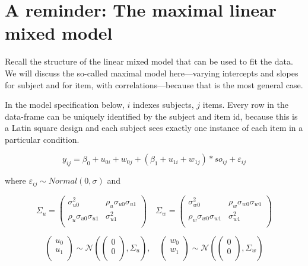 \documentclass[12pt,]{krantz}
\begin{document}
\hypertarget{a-reminder-the-maximal-linear-mixed-model}{%
\section{A reminder: The maximal linear mixed model}\label{a-reminder-the-maximal-linear-mixed-model}}

Recall the structure of the linear mixed model that can be used to fit the \citet{grodner} data. We will discuss the so-called maximal model here---varying intercepts and slopes for subject and for item, with correlations---because that is the most general case.

In the model specification below, \(i\) indexes subjects, \(j\) items. Every row in the data-frame can be uniquely identified by the subject and item id, because this is a Latin square design and each subject sees exactly one instance of each item in a particular condition.

\begin{equation}
y_{ij} = \beta_0 + u_{0i} + w_{0j} + (\beta_1 + u_{1i} + w_{1j}) * so_{ij} + \varepsilon_{ij}
\end{equation}

where \(\varepsilon_{ij} \sim Normal(0,\sigma)\) and

\begin{equation}\label{eq:covmatsimulations}
\Sigma_u
=
\begin{pmatrix}
\sigma _{u0}^2  & \rho _{u}\sigma _{u0}\sigma _{u1}\\
\rho _{u}\sigma _{u0}\sigma _{u1}    & \sigma _{u1}^2\\
\end{pmatrix}
\quad 
\Sigma _w
=
\begin{pmatrix}
\sigma _{w0}^2  & \rho _{w}\sigma _{w0}\sigma _{w1}\\
\rho _{w}\sigma _{w0}\sigma _{w1}    & \sigma _{w1}^2\\
\end{pmatrix}
\end{equation}

\begin{equation}\label{eq:jointpriordistsimulation}
\begin{pmatrix}
  u_0 \\ 
  u_1 \\
\end{pmatrix}
\sim 
\mathcal{N} \left(
\begin{pmatrix}
  0 \\
  0 \\
\end{pmatrix},
\Sigma_{u}
\right),
\quad
\begin{pmatrix}
  w_0 \\ 
  w_1 \\
\end{pmatrix}
\sim 
\mathcal{N}\left(
\begin{pmatrix}
  0 \\
  0 \\
\end{pmatrix},
\Sigma_{w}
\right)
\end{equation}
\end{document}
